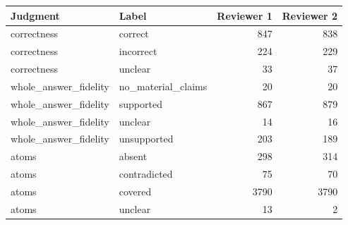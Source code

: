 \begin{tabular}{llrr}
\toprule
Judgment & Label & Reviewer 1 & Reviewer 2 \\
\midrule
correctness & correct & 847 & 838 \\
correctness & incorrect & 224 & 229 \\
correctness & unclear & 33 & 37 \\
whole\_answer\_fidelity & no\_material\_claims & 20 & 20 \\
whole\_answer\_fidelity & supported & 867 & 879 \\
whole\_answer\_fidelity & unclear & 14 & 16 \\
whole\_answer\_fidelity & unsupported & 203 & 189 \\
atoms & absent & 298 & 314 \\
atoms & contradicted & 75 & 70 \\
atoms & covered & 3790 & 3790 \\
atoms & unclear & 13 & 2 \\
\bottomrule
\end{tabular}

